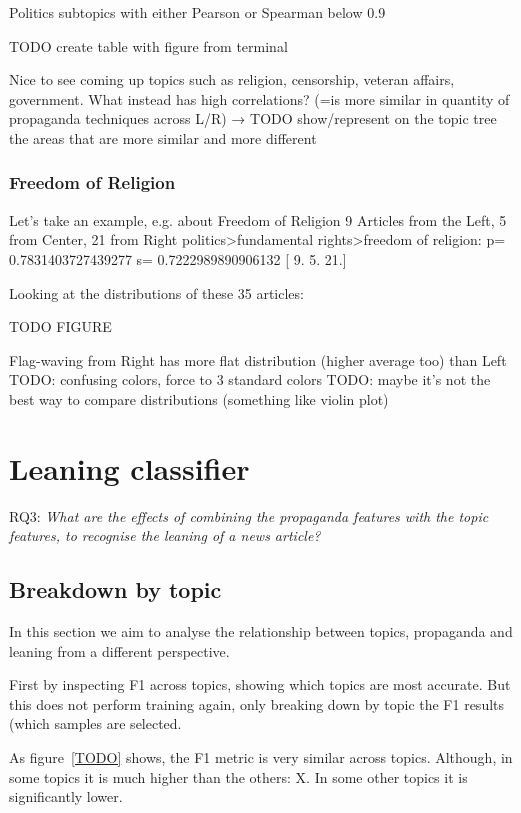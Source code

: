 Politics subtopics with either Pearson or Spearman below 0.9

TODO create table with figure from terminal

Nice to see coming up topics such as religion, censorship, veteran affairs, government.
What instead has high correlations? (=is more similar in quantity of propaganda techniques across L/R) → TODO show/represent on the topic tree the areas that are more similar and more different


\subsubsection{Freedom of Religion}
Let’s take an example, e.g. about Freedom of Religion
9 Articles from the Left, 5 from Center, 21 from Right
politics>fundamental rights>freedom of religion: p= 0.7831403727439277 s= 0.7222989890906132 [ 9.  5. 21.]

Looking at the distributions of these 35 articles:

TODO FIGURE

Flag-waving from Right has more flat distribution (higher average too) than Left
TODO: confusing colors, force to 3 standard colors
TODO: maybe it’s not the best way to compare distributions (something like violin plot)



\section{Leaning classifier}

RQ3: \emph{What are the effects of combining the propaganda features with the topic features, to recognise the leaning of a news article?}

\subsection{Breakdown by topic}
\label{sec:topic_classifier_propaganda}

In this section we aim to analyse the relationship between topics, propaganda and leaning from a different perspective.

First by inspecting F1 across topics, showing which topics are most accurate.
But this does not perform training again, only breaking down by topic the F1 results (which samples are selected.


As figure~\ref{TODO} shows, the F1 metric is very similar across topics.
Although, in some topics it is much higher than the others: X.
In some other topics it is significantly lower.

